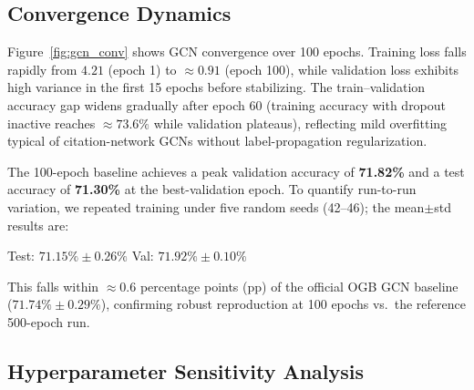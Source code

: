 \documentclass[10pt,twocolumn]{article}
\begin{document}
\subsection{Convergence Dynamics}
Figure~\ref{fig:gcn_conv} shows GCN convergence over 100 epochs.  Training loss
falls rapidly from $4.21$ (epoch 1) to $\approx 0.91$ (epoch 100), while
validation loss exhibits high variance in the first 15 epochs before stabilizing.
The train--validation accuracy gap widens gradually after epoch 60 (training
accuracy with dropout inactive reaches $\approx 73.6\%$ while validation
plateaus), reflecting mild overfitting typical of citation-network GCNs without
label-propagation regularization.

The 100-epoch baseline achieves a peak validation accuracy of \textbf{71.82\%}
and a test accuracy of \textbf{71.30\%} at the best-validation epoch. To quantify run-to-run
variation, we repeated training under five random seeds (42--46); the
mean$\pm$std results are:
\begin{center}
  \small
  Test: $71.15\% \pm 0.26\%$ \quad Val: $71.92\% \pm 0.10\%$
\end{center}
This falls within ${\approx}0.6$ percentage points (pp) of the official OGB
GCN baseline ($71.74\% \pm 0.29\%$), confirming robust reproduction at 100
epochs vs.\ the reference 500-epoch run.

\subsection{Hyperparameter Sensitivity Analysis}
\end{document}
